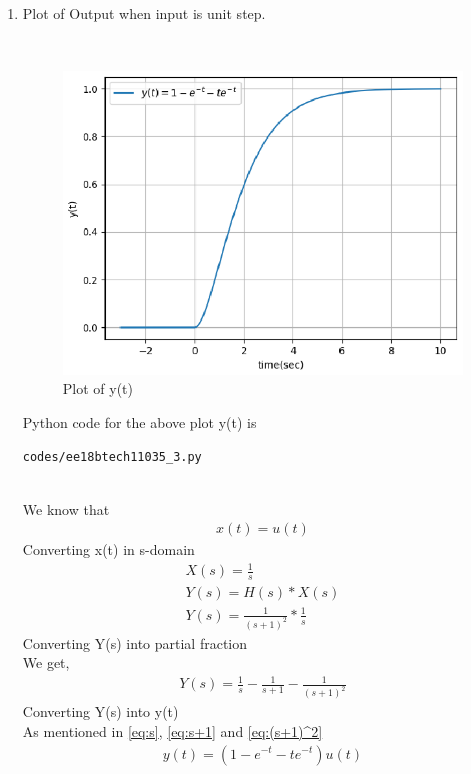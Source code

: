 \begin{enumerate}[label=\thesection.\arabic*.,ref=\thesection.\theenumi]
\item 
Plot of Output when input is unit step.

\\ \solution
\begin{figure}[!h]
\includegraphics[width=\columnwidth]{./figures/ee18btech11035_3.eps}
\caption{Plot of y(t)}
\label{fig:ee18btech11035_y(t)}
\end{figure}

Python code for the above plot y(t) is
\begin{lstlisting}
codes/ee18btech11035_3.py
\end{lstlisting}


\\
We know that
\begin{align}
x(t) = u(t)
\end{align}
Converting x(t) in s-domain 
\begin{align}
X(s) = \frac{1}{s}\\
Y(s) = H(s)*X(s)\\
Y(s) = \frac{1}{(s+1)^2}*\frac{1}{s}
\end{align}
Converting Y(s) into partial fraction\\
We get,
\begin{align}
Y(s) = \frac{1}{s}-\frac{1}{s+1}-\frac{1}{(s+1)^2}
\end{align}
Converting Y(s) into y(t)\\
As mentioned in \eqref{eq:s}, \eqref{eq:s+1} and \eqref{eq:(s+1)^2}\\
\begin{align}
y(t) = (1-e^{-t}-te^{-t})u(t)
\end{align}


\end{enumerate}